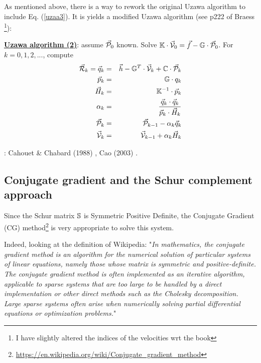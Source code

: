 As mentioned above, there is a way to rework the original Uzawa algorithm 
to include Eq. (\ref{uzaa3}). It is yields a modified 
Uzawa algorithm (see p222 of Braess \cite{braess}
\footnote{I have slightly 
altered the indices of the velocities wrt the book}):


\begin{mdframed}[backgroundcolor=blue!5]
\underline{\bf Uzawa algorithm (2)}: assume $\vec{\cal P}_0$ known. 
Solve $\mathbb{K}\cdot \vec{\cal V}_0 = \vec f - \mathbb{G}\cdot  \vec{\cal P}_0$. 
For $k=0,1,2,...$, compute 
\begin{eqnarray}
\vec{\cal R}_k=\vec q_k &=& \vec h-\mathbb{G}^T \cdot \vec{\cal V}_k + {\mathbb{C}} \cdot \vec{\cal P}_{k}\\
\vec{p}_k &=& {{\mathbb{G}}}\cdot q_k \\
\vec H_k &=& {{\mathbb{K}}}^{-1}\cdot \vec{p}_k \\
\alpha_k &=& \frac{\vec q_k \cdot \vec q_k}{\vec{p}_k \cdot \vec H_k} \\
\vec {\cal P}_k &=& \vec {\cal P}_{k-1} - \alpha_k  \vec q_k \\
\vec {\cal V}_{k} &=& \vec {\cal V}_{k-1} + \alpha_k  \vec H_k
\end{eqnarray}
\end{mdframed}


\Literature: Cahouet \& Chabard (1988) \cite{cach88}, Cao (2003) \cite{cao03}.





\subsection{Conjugate gradient and the Schur complement approach }
\label{ss:schurpcg}

 
Since the Schur matrix ${\mathbb{S}}$ is Symmetric Positive Definite, 
the Conjugate Gradient (CG) method\footnote{\url{https://en.wikipedia.org/wiki/Conjugate_gradient_method}} \cite{hest52} 
is very appropriate to solve this system. 

Indeed, looking at the definition of Wikipedia: "{\it In mathematics, the conjugate gradient method is an algorithm 
for the numerical solution of particular systems of linear equations, namely those whose matrix is symmetric and positive-definite. 
The conjugate gradient method is often implemented as an iterative algorithm, applicable to sparse systems that are too large 
to be handled by a direct implementation or other direct methods such as the Cholesky decomposition. 
Large sparse systems often arise when numerically solving partial differential equations or optimization problems.}"

